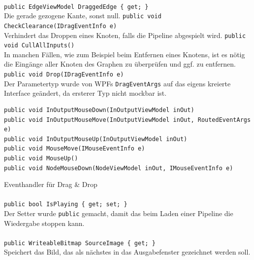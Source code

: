 \paragraph{}
\begin{itemize}
	\add \verb!public EdgeViewModel DraggedEdge { get; }! \\
	Die gerade gezogene Kante, sonst null.
	\add \verb!public void CheckClearance(IDragEventInfo e)! \\
	Verhindert das Droppen eines Knoten, falls die Pipeline abgespielt wird.
	\add \verb!public void CullAllInputs()! \\
	In manchen Fällen, wie zum Beispiel beim Entfernen eines Knotens, ist es nötig die Eingänge aller Knoten des Graphen zu überprüfen und ggf. zu entfernen.
	\change \verb!public void Drop(IDragEventInfo e)! \\
	Der Parametertyp wurde von WPFs \verb!DragEventArgs! auf das eigens kreierte Interface  geändert, da ersterer Typ nicht mockbar ist.
	\add \begin{verbatim}
public void InOutputMouseDown(InOutputViewModel inOut)
public void InOutputMouseMove(InOutputViewModel inOut, RoutedEventArgs e)
public void InOutputMouseUp(InOutputViewModel inOut)
public void MouseMove(IMouseEventInfo e)
public void MouseUp()
public void NodeMouseDown(NodeViewModel inOut, IMouseEventInfo e)
	\end{verbatim}
	Eventhandler für Drag \& Drop
\end{itemize}

\paragraph{}
\begin{itemize}
	\change \verb!public bool IsPlaying { get; set; }! \\
	Der Setter wurde \verb!public! gemacht, damit das  beim Laden einer Pipeline die Wiedergabe stoppen kann.
\end{itemize}

\paragraph{}
\begin{itemize}
	\add \verb!public WriteableBitmap SourceImage { get; }! \\
	Speichert das Bild, das als nächstes in das Ausgabefenster gezeichnet werden soll.
\end{itemize}
\newpage


